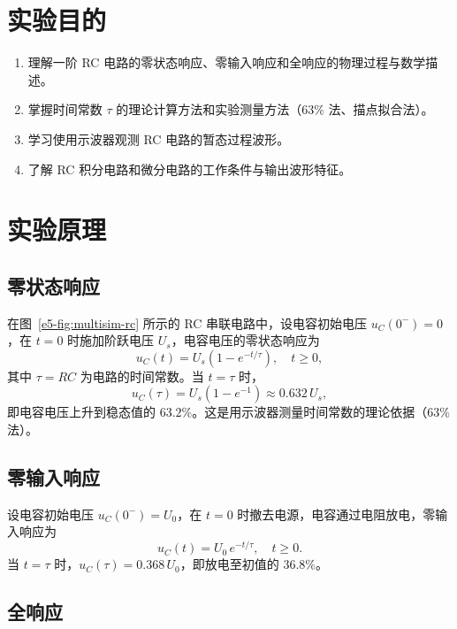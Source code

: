 \section{实验目的}

\begin{enumerate}[label=\arabic*.]
    \item 理解一阶 RC 电路的零状态响应、零输入响应和全响应的物理过程与数学描述。
    \item 掌握时间常数 \(\tau\) 的理论计算方法和实验测量方法（63\% 法、描点拟合法）。
    \item 学习使用示波器观测 RC 电路的暂态过程波形。
    \item 了解 RC 积分电路和微分电路的工作条件与输出波形特征。
\end{enumerate}

\section{实验原理}

\subsection{零状态响应}

在图~\ref{e5-fig:multisim-rc} 所示的 RC 串联电路中，设电容初始电压 \(u_C(0^-)=0\)，在 \(t=0\) 时施加阶跃电压 \(U_s\)，电容电压的零状态响应为
\begin{equation}
    u_C(t) = U_s\!\left(1 - e^{-t/\tau}\right), \quad t \geq 0,
\end{equation}
其中 \(\tau = RC\) 为电路的时间常数。当 \(t=\tau\) 时，
\begin{equation}
    u_C(\tau) = U_s(1-e^{-1}) \approx 0.632\,U_s,
\end{equation}
即电容电压上升到稳态值的 \(63.2\%\)。这是用示波器测量时间常数的理论依据（63\% 法）。

\subsection{零输入响应}

设电容初始电压 \(u_C(0^-)=U_0\)，在 \(t=0\) 时撤去电源，电容通过电阻放电，零输入响应为
\begin{equation}
    u_C(t) = U_0\,e^{-t/\tau}, \quad t \geq 0.
\end{equation}
当 \(t=\tau\) 时，\(u_C(\tau)=0.368\,U_0\)，即放电至初值的 \(36.8\%\)。

\subsection{全响应}

